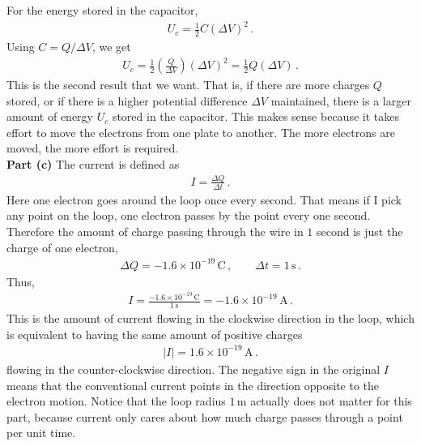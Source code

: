 \documentclass[11pt]{article}
\begin{document}
For the energy stored in the capacitor,
\begin{align*}
U_c = \frac{1}{2}C(\Delta V)^2\,.
\end{align*}
Using $C = Q/\Delta V$, we get
\begin{align*}
U_c = \frac{1}{2}\left(\frac{Q}{\Delta V}\right)(\Delta V)^2 = \frac{1}{2}Q(\Delta V)\,.
\end{align*}
This is the second result that we want. That is, if there are more charges $Q$ stored, or if there is a higher potential difference $\Delta V$ maintained, there is a larger amount of energy $U_c$ stored in the capacitor. This makes sense because it takes effort to move the electrons from one plate to another. The more electrons are moved, the more effort is required.\\

\noindent\textbf{Part (c)} The current is defined as
\begin{align*}
I = \frac{\Delta Q}{\Delta t}\,.
\end{align*}
Here one electron goes around the loop once every second. That means if I pick any point on the loop, one electron passes by the point every one second. Therefore the amount of charge passing through the wire in $1$ second is just the charge of one electron,
\begin{align*}
\Delta Q = -1.6\times 10^{-19}\,\text{C}\,,\qquad \Delta t = 1\,\text{s}\,.
\end{align*}
Thus,
\begin{align*}
I = \frac{-1.6\times 10^{-19}\,\text{C}}{1\,\text{s}} = -1.6\times 10^{-19}\,\text{A}\,.
\end{align*}
This is the amount of current flowing in the clockwise direction in the loop, which is equivalent to having the same amount of positive charges 
\begin{align*}
|I| = 1.6\times 10^{-19}\,\text{A}\,.
\end{align*}
flowing in the counter-clockwise direction. The negative sign in the original $I$ means that the conventional current points in the direction opposite to the electron motion. Notice that the loop radius $1\,$m actually does not matter for this part, because current only cares about how much charge passes through a point per unit time.\\
\end{document}
